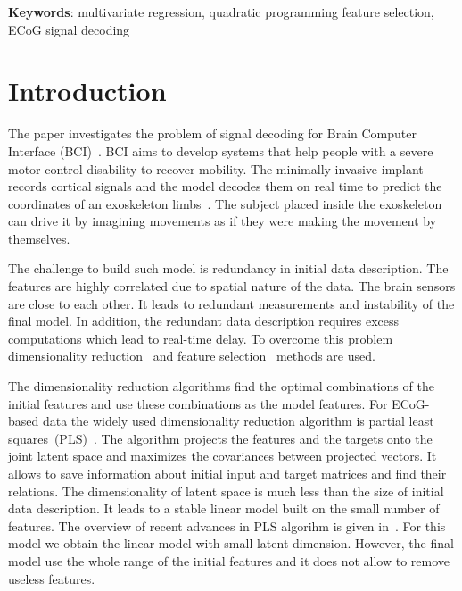 \documentclass[12pt,twoside]{article}
\theoremstyle{definition}
\begin{document}
\bigskip
\textbf{Keywords}: multivariate regression, quadratic programming feature selection, ECoG signal decoding

\section{Introduction}
The paper investigates the problem of signal decoding for Brain Computer Interface (BCI)~\cite{costecalde2018long}. 
BCI aims to develop systems that help people with a severe motor control disability to recover mobility.
The minimally-invasive implant records cortical signals and the model decodes them on real time to predict the coordinates of an exoskeleton limbs~\cite{mestais2015wimagine,eliseyev2014clinatec}.
The subject placed inside the exoskeleton can drive it by imagining movements as if they were making the movement by themselves. 

The challenge to build such model is redundancy in initial data description. 
The features are highly correlated due to spatial nature of the data. 
The brain sensors are close to each other. 
It leads to redundant measurements and instability of the final model.
In addition, the redundant data description requires excess computations which lead to real-time delay. 
To overcome this problem dimensionality reduction~\cite{chun2010sparse,mehmood2012review} and feature selection~\cite{katrutsa2015stress,li2017feature} methods are used.

The dimensionality reduction algorithms find the optimal combinations of the initial features and use these combinations as the model features. 
For ECoG-based data the widely used dimensionality reduction algorithm is partial least squares~(PLS)~\cite{eliseyev2014stable,engel2017kernel,eliseyev2012l1}. 
The algorithm projects the features and the targets onto the joint latent space and maximizes the covariances between projected vectors. 
It allows to save information about initial input and target matrices and find their relations. 
The dimensionality of latent space is much less than the size of initial data description. It leads to a stable linear model built on the small number of features. 
The overview of recent advances in PLS algorihm is given in~\cite{rosipal2006overview,rosipal2011nonlinear}.
For this model we obtain the linear model with small latent dimension.
However, the final model use the whole range of the initial features and it does not allow to remove useless features. 
\end{document}
